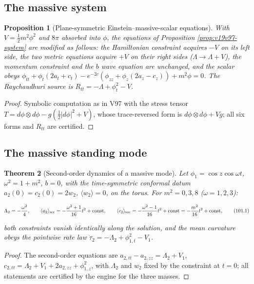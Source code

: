 \documentclass[11pt]{article}
\newtheorem{theorem}{Theorem}[section]
\newtheorem{proposition}[theorem]{Proposition}
\theoremstyle{remark}
\begin{document}
\subsection{The massive system}

\begin{proposition}[Plane-symmetric Einstein--massive-scalar equations]
\label{prop:v19v98-system}
With \(V=\tfrac12m^2\phi^2\) and \(8\pi\) absorbed into \(\phi\), the
equations of Proposition \ref{prop:v19v97-system} are modified as
follows: the Hamiltonian constraint acquires \(-V\) on its left side,
the two metric equations acquire \(+V\) on their right sides
(\(\Lambda\to\Lambda+V\)), the momentum constraint and the \(b\) wave
equation are unchanged, and the scalar obeys
\(\phi_{tt}+\phi_t(2a_t+c_t)-e^{-2c}(\phi_{zz}+\phi_z(2a_z-c_z))+m^2\phi=0\).
The Raychaudhuri source is \(R_{tt}=-\Lambda+\phi_t^2-V\).
\end{proposition}

\begin{proof}
Symbolic computation as in V97 with the stress tensor
\(T=d\phi\otimes d\phi-g(\tfrac12|d\phi|^2+V)\), whose trace-reversed
form is \(d\phi\otimes d\phi+Vg\); all six forms and \(R_{tt}\) are
certified.
\end{proof}

\subsection{The massive standing mode}

\begin{theorem}[Second-order dynamics of a massive mode]
\label{thm:v19v98-mode}
Let \(\phi_1=\cos z\cos\omega t\), \(\omega^2=1+m^2\), \(b=0\), with
the time-symmetric conformal datum \(a_2(0)=c_2(0)=2w_2\),
\(\langle w_2\rangle=0\), on the torus.  For \(m^2=0,3,8\)
(\(\omega=1,2,3\)):

\[
 \Lambda_2=-\frac{\omega^2}4,\qquad
 \langle a_2\rangle_{\rm sec}=-\frac{\omega^2+1}{16}t^2+\hbox{const},\qquad
 \langle c_2\rangle_{\rm sec}=-\frac{\omega^2-1}{16}t^2+\hbox{const}=-\frac{m^2}{16}t^2+\hbox{const},
                                                                    \tag{101.1}
\]

both constraints vanish identically along the solution, and the
mean curvature obeys the pointwise rate law
\(\dot\tau_2=-\Lambda_2+\phi_{1,t}^2-V_1\).
\end{theorem}

\begin{proof}
The second-order equations are \(a_{2,tt}-a_{2,zz}=\Lambda_2+V_1\),
\(c_{2,tt}=\Lambda_2+V_1+2a_{2,zz}+\phi_{1,z}^2\), with \(\Lambda_2\)
and \(w_2\) fixed by the constraint at \(t=0\); all statements are
certified by the engine for the three masses.
\end{proof}
\end{document}

